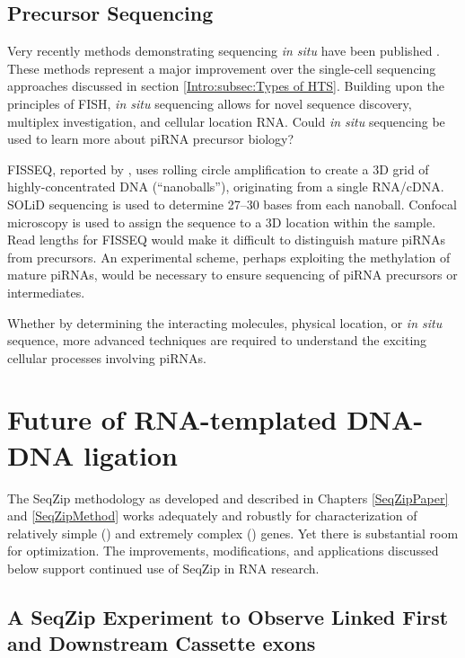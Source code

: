   \subsection{Precursor Sequencing}
    \label{Disc:subsec:Sequencing of Precursors}

    Very recently methods demonstrating sequencing \textit{in situ} have been published \citep{Ke2013,Lee2014a}. These methods represent a major improvement over the single-cell sequencing approaches discussed in section \ref{Intro:subsec:Types of HTS}. Building upon the principles of FISH, \textit{in situ} sequencing allows for novel sequence discovery, multiplex investigation, and cellular location RNA. Could \textit{in situ} sequencing be used to learn more about piRNA precursor biology?

    FISSEQ, reported by \citet{Lee2014a}, uses rolling circle amplification to create a 3D grid of highly-concentrated DNA (``nanoballs''), originating from a single RNA/cDNA. SOLiD sequencing is used to determine 27--30 bases from each nanoball. Confocal microscopy is used to assign the sequence to a 3D location within the sample. Read lengths for FISSEQ would make it difficult to distinguish mature piRNAs from precursors. An experimental scheme, perhaps exploiting the methylation of mature piRNAs, would be necessary to ensure sequencing of piRNA precursors or intermediates.

    Whether by determining the interacting molecules, physical location, or \textit{in situ} sequence, more advanced techniques are required to understand the exciting cellular processes involving piRNAs.

\section{Future of RNA-templated DNA-DNA ligation}
  \label{Disc:sec:SeqZip Improvements}

  The SeqZip methodology as developed and described in Chapters \ref{SeqZipPaper} and \ref{SeqZipMethod} works adequately and robustly for characterization of relatively simple (\cd{}) and extremely complex (\dscam{}) genes. Yet there is substantial room for optimization. The improvements, modifications, and applications discussed below support continued use of SeqZip in RNA research.

  \subsection{A SeqZip Experiment to Observe Linked First and Downstream Cassette exons}
    \label{Disc:subsec: Ideal SeqZip exp. to look for Coordination}

